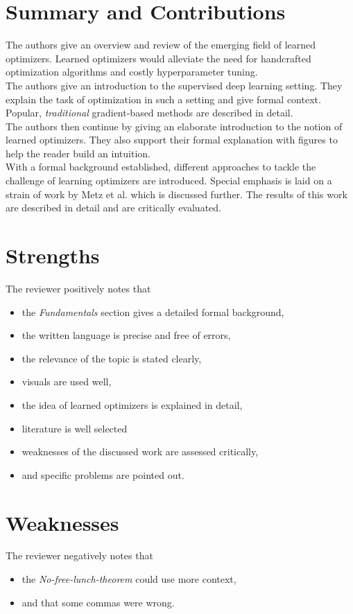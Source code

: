 \documentclass[a4paper]{scrartcl}
\begin{document}
	
\section*{Summary and Contributions}
The authors give an overview and review of the emerging field of learned optimizers. Learned optimizers would alleviate the need for handcrafted optimization algorithms and costly hyperparameter tuning.\\
The authors give an introduction to the supervised deep learning setting. They explain the task of optimization in such a setting and give formal context. Popular, \textit{traditional} gradient-based methods are described in detail.\\
The authors then continue by giving an elaborate introduction to the notion of learned optimizers. They also support their formal explanation with figures to help the reader build an intuition. \\
With a formal background established, different approaches to tackle the challenge of learning optimizers are introduced. Special emphasis is laid on a strain of work by Metz et al. which is discussed further. The results of this work are described in detail and are critically evaluated.

\section*{Strengths}
The reviewer positively notes that
\begin{itemize}
	\item the \textit{Fundamentals} section gives a detailed formal background,
	\item the written language is precise and free of errors,
	\item the relevance of the topic is stated clearly,
	\item visuals are used well,
	\item the idea of learned optimizers is explained in detail,
	\item literature is well selected
	\item weaknesses of the discussed work are assessed critically,
	\item and specific problems are pointed out.
\end{itemize}


\section*{Weaknesses}
The reviewer negatively notes that
\begin{itemize}
	\item the \textit{No-free-lunch-theorem} could use more context,
	\item and that some commas were wrong.
\end{itemize}
\end{document}
